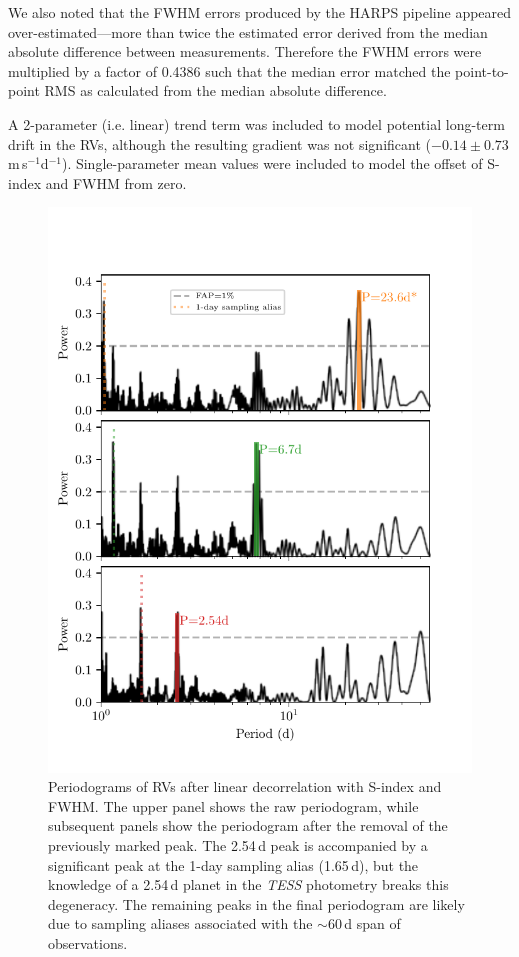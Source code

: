 \documentclass[fleqn,usenatbib]{mnras}
\newcommand{\tess}{{\it TESS}}
\newcommand{\harps}{{HARPS}}
\newcommand{\ms}{m\,s$^{-1}$}
\begin{document}
We also noted that the FWHM errors produced by the \harps{} pipeline appeared over-estimated---more than twice the estimated error derived from the median absolute difference between measurements.
Therefore the FWHM errors were multiplied by a factor of 0.4386 such that the median error matched the point-to-point RMS as calculated from the median absolute difference.

A 2-parameter (i.e. linear) trend term was included to model potential long-term drift in the RVs, although the resulting gradient was not significant ($-0.14\pm0.73$\,\ms{}d$^{-1}$).
Single-parameter mean values were included to model the offset of S-index and FWHM from zero.


\begin{figure}
	\includegraphics[width=\columnwidth, trim={0.3cm 1.1cm 0.8cm 1.3cm}]{TOI755_decorrelation_periodograms}
    \caption{Periodograms of RVs after linear decorrelation with S-index and FWHM. The upper panel shows the raw periodogram, while subsequent panels show the periodogram after the removal of the previously marked peak. The 2.54\,d peak is accompanied by a significant peak at the 1-day sampling alias (1.65\,d), but the knowledge of a 2.54\,d planet in the \tess{} photometry breaks this degeneracy. The remaining peaks in the final periodogram are likely due to sampling aliases associated with the $\sim60$\,d span of observations.}
    \label{fig:rv_decorr}
\end{figure}
\end{document}
